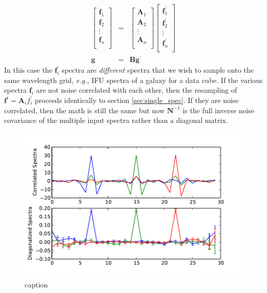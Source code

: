 \documentclass[12pt]{article}
\newcommand{\A}{\mathbf{A}}
\newcommand{\N}{\mathbf{N}}
\newcommand{\f}{\mathbf{f}}
\begin{document}
\begin{eqnarray}
    \left[ \begin{array}{c}
        \f_1 \\
        \f_2 \\
        \vdots \\
        \f_n \\
    \end{array}
    \right] & = & \left[ \begin{array}{c}
        \A_1 \\
        \A_2 \\
        \vdots \\
        \A_n \\
    \end{array}
    \right] \left[ \begin{array}{c}
        \f_1^\prime \\
        \f_2^\prime \\
        \vdots \\
        \f_n^\prime \\
    \end{array}    
    \right] \\
    \mathbf{g} & = & \mathbf{B} \mathbf{g}^\prime
\end{eqnarray}
In this case the $\f_i^\prime$ spectra are {\em different} spectra that
we wish to sample onto the same wavelength grid, {\it e.g.}, IFU spectra
of a galaxy for a data cube.  If the various spectra $\f_i$ are not noise
correlated with each other,
then the resampling of $\f^i = \A_i f_i^\prime$ proceeds identically to
section \ref{sec:single_spec}.  If they are noise correlated, then the
math is still the same but now $\N^{-1}$ is the full inverse noise covariance
of the multiple input spectra rather than a diagonal matrix.

\begin{figure}[t]
\centering
\includegraphics{plots/multiple_spectra.pdf}
\caption{
caption
}
\label{fig:multiple_spectra}
\end{figure}
\end{document}
